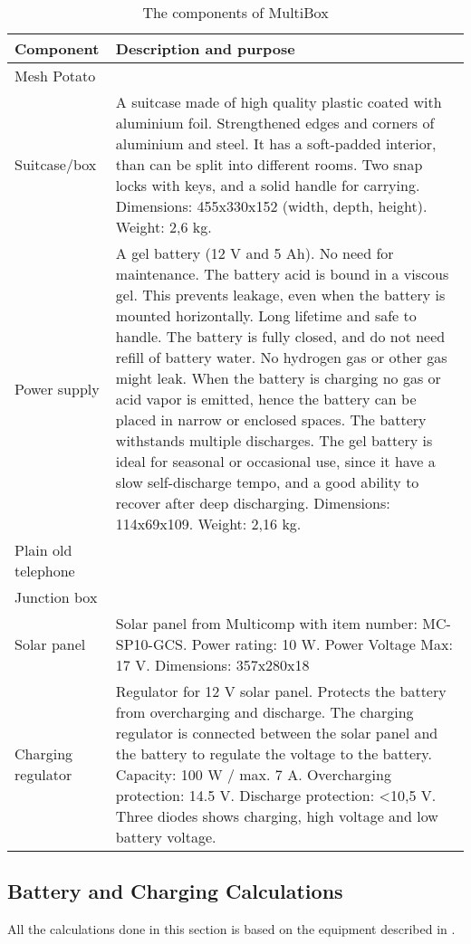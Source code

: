 \begin{center}
\begin{table}[!hb]
\caption{\label{tab:components}The components of MultiBox}
    \begin{tabular}{ | l | p{9cm} |}
    \hline
    \textbf{Component} & \textbf{Description and purpose} \\ 
    \hline
    Mesh Potato &  \\ 
    \hline
    Suitcase/box &  A suitcase made of high quality plastic coated with aluminium foil. Strengthened edges and corners of aluminium and steel. It has a soft-padded interior, than can be split into different rooms. Two snap locks with keys, and a solid handle for carrying. Dimensions: 455x330x152 (width, depth, height). Weight: 2,6 kg. \\ 
    \hline
    Power supply & A gel battery (12 V and 5 Ah). No need for maintenance. The battery acid is bound in a viscous gel. This prevents leakage, even when the battery is mounted horizontally. Long lifetime and safe to handle. The battery is fully closed, and do not need refill of battery water. No hydrogen gas or other gas might leak. When the battery is charging no gas or acid vapor is emitted, hence the battery can be placed in narrow or enclosed spaces. The battery withstands multiple discharges. The gel battery is ideal for seasonal or occasional use, since it have a slow self-discharge tempo, and a good ability to recover after deep discharging. Dimensions: 114x69x109. Weight: 2,16 kg. \\
    \hline
    Plain old telephone & \\
	\hline
	Junction box & \\
	\hline
	Solar panel & Solar panel from Multicomp with item number: MC-SP10-GCS. Power rating: 10 W. Power Voltage Max: 17 V. Dimensions: 357x280x18\\
	\hline
	Charging regulator & Regulator for 12 V solar panel. Protects the battery from overcharging and discharge. The charging regulator is connected between the solar panel and the battery to regulate the voltage to the battery. Capacity: 100 W / max. 7 A. Overcharging protection: 14.5 V. Discharge protection: <10,5 V. Three diodes shows charging, high voltage and low battery voltage. \\
	\hline
    \end{tabular}
   \end{table}
\end{center}

\subsection{Battery and Charging Calculations}
All the calculations done in this section is based on the equipment described in .

